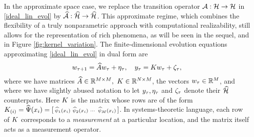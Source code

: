 In the approximate space case, we replace the transition operator $\mathcal{A}:\mathcal{H}\to\mathcal{H}$ in \eqref{ideal_lin_evol} by $\widehat{\mathcal{A}}:\widehat{\mathcal{H}}\to\widehat{\mathcal{H}}$.
This approximate regime, which combines the flexibility of a truly nonparametric approach with computational realizability, still allows for the representation of rich phenomena, as will be seen in the sequel, and in Figure \ref{fig:kernel_variation}. 
The finite-dimensional evolution equations approximating \eqref{ideal_lin_evol} in dual form are
\vspace{-0.05in}
\begin{align} \eqlabel{k_measure}
 \weight_{\tindex+1} = \dualopApprox\weight_{\tindex} + \processnoise_{\tindex}, \quad 
 \meas_{\tindex} = \obsMat \weight_{\tindex} +\measnoise_{\tindex},
\end{align}
where we have matrices $\dualopApprox\in \R^{\ncent\times\ncent}, \ \obsMat\in \R^{\nsamp\times\ncent}$, the vectors $w_{\tau}\in\mathbb{R}^{M}$, and where we have slightly abused notation to let $y_{\tau}, \eta_{\tau}$ and $\zeta_{\tau}$ denote their $\widehat{\mathcal{H}}$ counterparts. Here $K$ is the matrix whose rows are of the form $K_{(i)} = \widehat{\Psi}(x_i) =
 \left[\begin{smallmatrix}
  \widehat{\psi}_1(x_i) & \widehat{\psi}_2(x_i) & \cdots & \widehat{\psi}_{M}(x_i)
 \end{smallmatrix}\right]$. In systems-theoretic language, each row of $K$ corresponds to a \emph{measurement} at a particular location, and the matrix itself acts as a measurement operator. 

